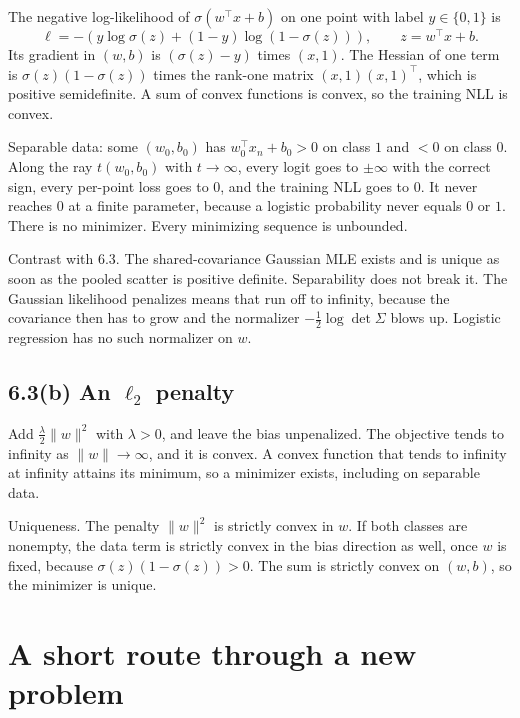 \documentclass[11pt]{article}
\theoremstyle{remark}
\begin{document}
The negative log-likelihood of \(\sigma(w^\top x+b)\) on one point with label \(y\in\{0,1\}\) is
\[
\ell=-(y\log\sigma(z)+(1-y)\log(1-\sigma(z))),\qquad z=w^\top x+b.
\]
Its gradient in \((w,b)\) is \((\sigma(z)-y)\) times \((x,1)\). The Hessian of one term is \(\sigma(z)(1-\sigma(z))\) times the rank-one matrix \((x,1)(x,1)^\top\), which is positive semidefinite. A sum of convex functions is convex, so the training NLL is convex.

Separable data: some \((w_0,b_0)\) has \(w_0^\top x_n+b_0>0\) on class \(1\) and \(<0\) on class \(0\). Along the ray \(t(w_0,b_0)\) with \(t\to\infty\), every logit goes to \(\pm\infty\) with the correct sign, every per-point loss goes to \(0\), and the training NLL goes to \(0\). It never reaches \(0\) at a finite parameter, because a logistic probability never equals \(0\) or \(1\). There is no minimizer. Every minimizing sequence is unbounded.

Contrast with 6.3. The shared-covariance Gaussian MLE exists and is unique as soon as the pooled scatter is positive definite. Separability does not break it. The Gaussian likelihood penalizes means that run off to infinity, because the covariance then has to grow and the normalizer \(-\tfrac12\log\det\Sigma\) blows up. Logistic regression has no such normalizer on \(w\).

\subsection*{6.3(b) An \texorpdfstring{\(\ell_2\)}{l2} penalty}

Add \(\tfrac{\lambda}{2}\lVert w\rVert^2\) with \(\lambda>0\), and leave the bias unpenalized. The objective tends to infinity as \(\lVert w\rVert\to\infty\), and it is convex. A convex function that tends to infinity at infinity attains its minimum, so a minimizer exists, including on separable data.

Uniqueness. The penalty \(\lVert w\rVert^2\) is strictly convex in \(w\). If both classes are nonempty, the data term is strictly convex in the bias direction as well, once \(w\) is fixed, because \(\sigma(z)(1-\sigma(z))>0\). The sum is strictly convex on \((w,b)\), so the minimizer is unique.

\newpage
\section{A short route through a new problem}
\end{document}

